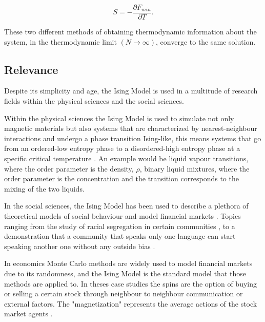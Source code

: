 \begin{equation}
	S = - \frac{\partial F_{min}}{\partial T}.
\end{equation}

	These two different methods of obtaining thermodynamic information about the system, in the thermodynamic limit $(N\rightarrow \infty)$, converge to the same solution. 

\subsection{Relevance}

Despite its simplicity and age, the Ising Model is used in a multitude of research fields within the physical sciences and the social sciences. 

Within the physical sciences the Ising Model is used to simulate not only magnetic materials but also systems that are characterized by nearest-neighbour interactions and undergo a phase transition Ising-like, this means systems that go from an ordered-low entropy phase to a disordered-high entropy phase at a specific critical temperature \cite{Pelissetto2002}. 
An example would be liquid vapour transitions, where the order parameter is the density, $\rho$, binary liquid mixtures, where the order parameter is the concentration and the transition corresponds to the mixing of the two liquids.

In the social sciences, the Ising Model has been used to describe a plethora of theoretical models of social behaviour and model financial markets \cite{review_social_ising}. 
Topics ranging from the study of racial segregation in certain communities \cite{segregation}, to a demonstration that a community that speaks only one language can start speaking another one without any outside bias \cite{language_ising}.

In economics Monte Carlo methods are widely used to model financial markets due to its randomness, and the Ising Model is the standard model that those methods are applied to. In theses case studies the spins are the option of buying or selling a certain stock through neighbour to neighbour communication or external factors. The "magnetization" represents the average actions of the stock market agents \cite{stock_ising, eco_thesis}.












